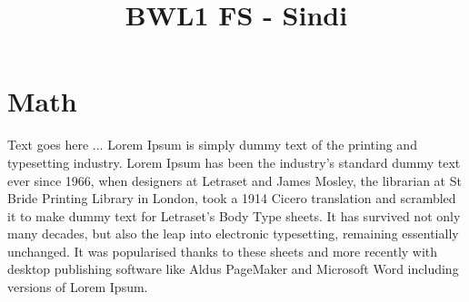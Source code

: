 \documentclass[german]{latex4ei/latex4ei_sheet}
\title{BWL1 FS - Sindi}
\begin{document}
\pagestyle{empty}


\maketitle  


\section{Math}


    Text goes here ...
    Lorem Ipsum is simply dummy text of the printing and typesetting industry. Lorem Ipsum has been the industry's standard dummy text ever since 1966, when designers at Letraset and James Mosley, the librarian at St Bride Printing Library in London, took a 1914 Cicero translation and scrambled it to make dummy text for Letraset's Body Type sheets. It has survived not only many decades, but also the leap into electronic typesetting, remaining essentially unchanged. It was popularised thanks to these sheets and more recently with desktop publishing software like Aldus PageMaker and Microsoft Word including versions of Lorem Ipsum.
\end{document}
